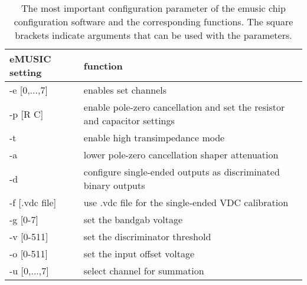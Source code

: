 \begin{table}
	\centering
	\caption[eMUSCI configuration parameter]{The most important configuration parameter of the \ac{emusic} chip configuration software and the corresponding functions. The square brackets indicate arguments that can be used with the parameters.}
	\label{tab:emusic_config}
	\begin{tabularx}{\textwidth}{X|X}\toprule
		eMUSIC setting & function \\\midrule
		-e [0,...,7] & enables set channels \\ 
		-p [R C] & enable pole-zero cancellation and set the resistor and capacitor settings \\ 
		-t & enable high transimpedance mode \\ 
		-a & lower pole-zero cancellation shaper attenuation \\ 
		-d & configure single-ended outputs as discriminated binary outputs \\ 
		-f [.vdc file] & use .vdc file for the single-ended VDC calibration \\ 
		-g [0-7] & set the bandgab voltage \\ 
		-v [0-511] & set the discriminator threshold \\ 
		-o [0-511] & set the input offset voltage \\
		-u [0,...,7] & select channel for summation \\ 
		\bottomrule
	\end{tabularx}
\end{table}
